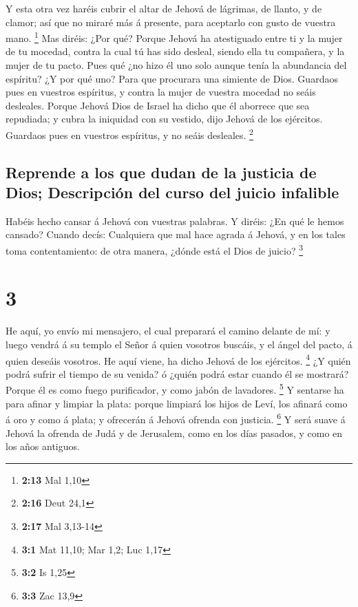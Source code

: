  Y esta otra vez haréis cubrir el altar de Jehová de
lágrimas, de llanto, y de clamor; así que no miraré más á presente, para
aceptarlo con gusto de vuestra mano. \footnote{\textbf{2:13} Mal 1,10}
 Mas diréis: ¿Por qué? Porque Jehová ha atestiguado entre
ti y la mujer de tu mocedad, contra la cual tú has sido desleal, siendo
ella tu compañera, y la mujer de tu pacto.  Pues qué ¿no
hizo él uno solo aunque tenía la abundancia del espíritu? ¿Y por qué
uno? Para que procurara una simiente de Dios. Guardaos pues en vuestros
espíritus, y contra la mujer de vuestra mocedad no seáis desleales.
 Porque Jehová Dios de Israel ha dicho que él aborrece que
sea repudiada; y cubra la iniquidad con su vestido, dijo Jehová de los
ejércitos. Guardaos pues en vuestros espíritus, y no seáis desleales.
\footnote{\textbf{2:16} Deut 24,1}

\hypertarget{reprende-a-los-que-dudan-de-la-justicia-de-dios-descripciuxf3n-del-curso-del-juicio-infalible}{%
\subsection{Reprende a los que dudan de la justicia de Dios; Descripción
del curso del juicio
infalible}\label{reprende-a-los-que-dudan-de-la-justicia-de-dios-descripciuxf3n-del-curso-del-juicio-infalible}}

 Habéis hecho cansar á Jehová con vuestras palabras. Y
diréis: ¿En qué le hemos cansado? Cuando decís: Cualquiera que mal hace
agrada á Jehová, y en los tales toma contentamiento: de otra manera,
¿dónde está el Dios de juicio? \footnote{\textbf{2:17} Mal 3,13-14}

\hypertarget{section-2}{%
\section{3}\label{section-2}}

 He aquí, yo envío mi mensajero, el cual preparará el camino
delante de mí: y luego vendrá á su templo el Señor á quien vosotros
buscáis, y el ángel del pacto, á quien deseáis vosotros. He aquí viene,
ha dicho Jehová de los ejércitos. \footnote{\textbf{3:1} Mat 11,10; Mar
  1,2; Luc 1,17}  ¿Y quién podrá sufrir el tiempo de su
venida? ó ¿quién podrá estar cuando él se mostrará? Porque él es como
fuego purificador, y como jabón de lavadores. \footnote{\textbf{3:2} Is
  1,25}  Y sentarse ha para afinar y limpiar la plata:
porque limpiará los hijos de Leví, los afinará como á oro y como á
plata; y ofrecerán á Jehová ofrenda con justicia. \footnote{\textbf{3:3}
  Zac 13,9}  Y será suave á Jehová la ofrenda de Judá y de
Jerusalem, como en los días pasados, y como en los años antiguos.

